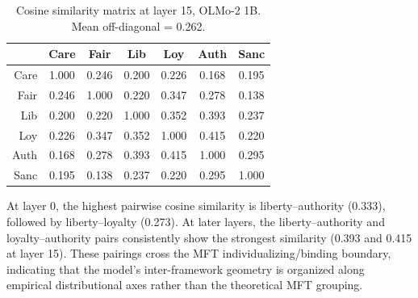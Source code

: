\begin{table}[h]
\centering
\caption{Cosine similarity matrix at layer 15, OLMo-2 1B. Mean off-diagonal = 0.262.}
\label{tab:cosine_l15}
\small
\begin{tabular}{r cccccc}
\toprule
     & Care & Fair & Lib & Loy & Auth & Sanc \\
\midrule
Care & 1.000 & 0.246 & 0.200 & 0.226 & 0.168 & 0.195 \\
Fair & 0.246 & 1.000 & 0.220 & 0.347 & 0.278 & 0.138 \\
Lib  & 0.200 & 0.220 & 1.000 & 0.352 & 0.393 & 0.237 \\
Loy  & 0.226 & 0.347 & 0.352 & 1.000 & 0.415 & 0.220 \\
Auth & 0.168 & 0.278 & 0.393 & 0.415 & 1.000 & 0.295 \\
Sanc & 0.195 & 0.138 & 0.237 & 0.220 & 0.295 & 1.000 \\
\bottomrule
\end{tabular}
\end{table}

At layer 0, the highest pairwise cosine similarity is
liberty--authority (0.333), followed by liberty--loyalty (0.273).
At later layers, the liberty--authority and loyalty--authority pairs
consistently show the strongest similarity (0.393 and 0.415 at
layer 15). These pairings cross the MFT individualizing/binding
boundary, indicating that the model's inter-framework geometry is
organized along empirical distributional axes rather than the
theoretical MFT grouping.
